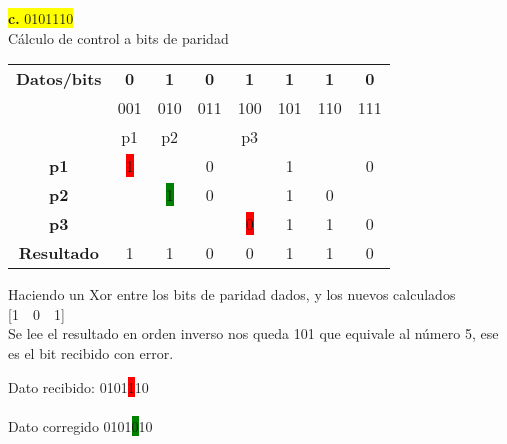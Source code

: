\documentclass{article}
\begin{document}
	\newpage
	\begin{center}
		\hspace{3cm}\colorbox{yellow}{{\textbf{c.} 0101110}}\newline
		\\Cálculo de control a bits de paridad
		
		\begin{table}[h!]
			\centering
			\begin{tabular}{c|ccccccc}
				\toprule
				\textbf{Datos/bits} & \textbf{0} & \textbf{1} & \textbf{0} & \textbf{1} & \textbf{1} & \textbf{1} & \textbf{0}\\ & \scriptsize001 & \scriptsize010 & \scriptsize011 & \scriptsize100 & \scriptsize101 & \scriptsize110 & \scriptsize111\\
				\midrule
				\textbf{} & p1 & p2 & & p3 & & & \\
				\midrule
				\textbf{p1} & \colorbox{red}{1} & & 0 & & 1 & & 0\\
				\midrule
				\textbf{p2} &  & \colorbox{green}{1} & 0 & & 1 & 0  \\
				\midrule
				\textbf{p3} & & & & \colorbox{red}{0} & 1 & 1 & 0 \\
				\midrule
				\textbf{Resultado} & 1 & 1 & 0 & 0 & 1 & 1 & 0\\
				\bottomrule
			\end{tabular}
		\end{table}
	\end{center}
	
	\begin{center}
		Haciendo un Xor entre los bits de paridad dados, y los nuevos calculados
		\vspace{0.1cm}
		[1~~0~~1]\\
		
		\vspace{0.5cm}
		Se lee el resultado en orden inverso nos queda 101 que equivale al número 5, ese es el bit recibido con error.
	\end{center}
	\vspace{0.3cm}
	Dato recibido: 0101\colorbox{red}{1}10\\\\
	Dato corregido 0101\colorbox{green}{0}10\\
	
\end{document}
